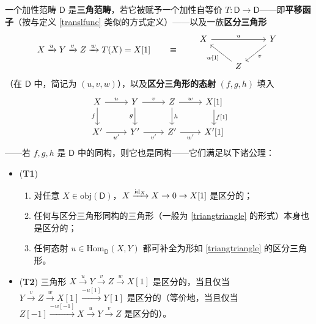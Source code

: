 \begin{Def}\label{triangcat}
	一个加性范畴 $\mathsf{D}$ 是\textbf{三角范畴}，若它被赋予一个加性自等价 $T:\mathsf{D}\rightarrow\mathsf{D}$——即\textbf{平移函子}（按与定义 \ref{translfunc} 类似的方式定义）——以及一族\textbf{区分三角形}
	\begin{equation}\label{triangtriangle}
		X\xrightarrow{u}Y\xrightarrow{v}Z\xrightarrow{w}T(X)=X[1]
		\qquad\equiv\qquad
		\begin{tikzcd}
			X\arrow[rr, "u"] & & Y\arrow[dl, "v"]\\
			& Z\arrow[ul, "{w[1]}"]
		\end{tikzcd}
	\end{equation}
	（在 $\mathsf{D}$ 中，简记为 $(u,v,w)$），以及\textbf{区分三角形的态射} $(f,g,h)$ 填入\vspace*{-0.2cm}
	\begin{equation}
		\begin{tikzcd}
			X\arrow[r,"u"]\arrow[d,"f"'] & Y\arrow[r,"v"]\arrow[d,"g"'] & Z\arrow[r,"w"]\arrow[d,"h"] & {X[1]}\arrow[d,"{f[1]}"] \\
			X'\arrow[r,"u'"'] & Y'\arrow[r,"v'"'] & Z'\arrow[r,"w'"'] & X'[1]
		\end{tikzcd}
	\end{equation}
	——若 $f,g,h$ 是 $\mathsf{D}$ 中的同构，则它也是同构——它们满足以下诸公理：
	\begin{itemize}[leftmargin=0.5cm]
		\renewcommand{\labelitemi}{\textendash}
		
		\item (\textbf{T1})\renewcommand{\theenumi}{\alph{enumi}}\vspace*{-0.3cm} 
		\begin{enumerate}[leftmargin=0.5cm] 
			\item 对任意 $X\in\text{obj}(\mathsf{D})$，$X\xrightarrow{\textup{id}_X}X\rightarrow 0\rightarrow X[1]$ 是区分的；
			
			\item 任何与区分三角形同构的三角形（一般为 \eqref{triangtriangle} 的形式）本身也是区分的；
			
			\item 任何态射 $u\in\text{Hom}_\mathsf{D}(X,Y)$ 都可补全为形如 \eqref{triangtriangle} 的区分三角形。
		\end{enumerate}
		
		\item (\textbf{T2}) 三角形 $X\xrightarrow{u}Y\xrightarrow{v}Z\xrightarrow{w}X[1]$ 是区分的，当且仅当 $Y\xrightarrow{v}Z\xrightarrow{w}X[1]\xrightarrow{-u[1]}Y[1]$ 是区分的（等价地，当且仅当 $Z[-1]\xrightarrow{-w[-1]}X\xrightarrow{u}Y\xrightarrow{v}Z$ 是区分的）。
		

\end{itemize}
\end{Def}
